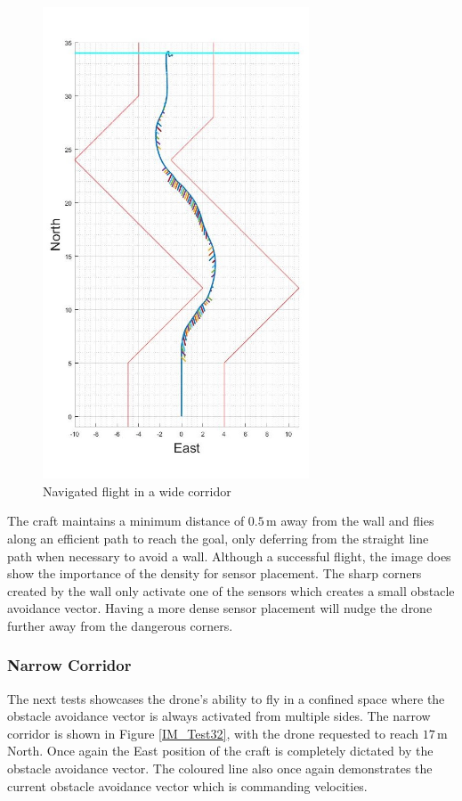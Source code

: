 			\begin{figure}[H]
				\centering
				\includegraphics[height = 14cm]{../References/Testing/WideCorridor3DProx.jpg}     
				\caption{Navigated flight in a wide corridor}
				\label{IM_Test31}
			\end{figure}
			
			The craft maintains a minimum distance of $0.5$\,m away from the wall and flies along an efficient path to reach the goal, only deferring from the straight line path when necessary to avoid a wall. Although a successful flight, the image does show the importance of the density for sensor placement. The sharp corners created by the wall only activate one of the sensors which creates a small obstacle avoidance vector. Having a more dense sensor placement will nudge the drone further away from the dangerous corners.
			
			\subsubsection{Narrow Corridor}
			The next tests showcases the drone's ability to fly in a confined space where the obstacle avoidance vector is always activated from multiple sides. The narrow corridor is shown in Figure \ref{IM_Test32}, with the drone requested to reach $17$\,m North. Once again the East position of the craft is completely dictated by the obstacle avoidance vector. The coloured line also once again demonstrates the current obstacle avoidance vector which is commanding velocities.
			
